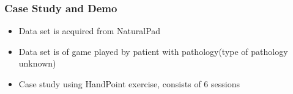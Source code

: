 \documentclass{beamer}
\begin{document}
\begin{frame}
\frametitle{Case Study and Demo}
\begin{itemize}
\item Data set is acquired from NaturalPad
\item Data set is of game played by patient with pathology(type of pathology unknown)
\item Case study using HandPoint exercise, consists of 6 sessions
\end{itemize}

\end{frame}
\end{document}
